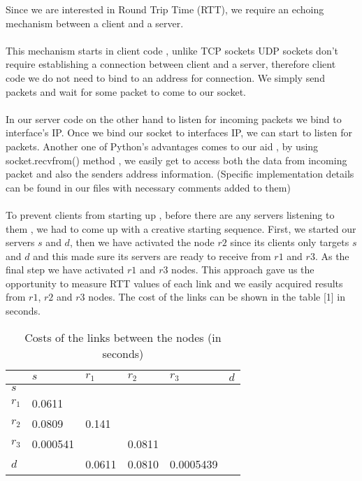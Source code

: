 \documentclass[conference]{IEEEtran}
\begin{document}
Since we are interested in Round Trip Time (RTT), we require an echoing mechanism between a client and a server. \\
\\
This mechanism starts in client code , unlike TCP sockets UDP sockets don't require establishing a connection between client and a server, therefore client code we do not need to bind to an address for connection. We simply send packets and wait for some packet to come to our socket. \\
\\
In our server code on the other hand to listen for incoming packets we bind to interface's IP. Once we bind our socket to interfaces IP,  we can start to listen for packets. Another one of Python's advantages comes to our aid , by using socket.recvfrom() method , we easily get to access both the data from incoming packet and also the senders address information. (Specific implementation details can be found in our files with necessary comments added to them)\\
\\
To prevent clients from starting up , before there are any servers listening to them , we had to come up with a creative starting sequence. First, we started our servers $s$ and $d$, then we have activated the node $r2$ since its clients only targets $s$ and $d$ and this made sure its servers are ready to receive from $r1$ and $r3$. As the final step we have activated $r1$ and $r3$ nodes. This approach gave us the opportunity to measure RTT values of each link and we easily acquired results from $r1$, $r2$ and $r3$ nodes. The cost of the links can be shown in the table [1] in seconds.

\begin{table}[!htbp]
\caption{Costs of the links between the nodes (in seconds)}
\begin{tabular}{|l|l|l|l|l|l|}
\hline
               & \textbf{$s$} & \textbf{$r_1$} & \textbf{$r_2$} & \textbf{$r_3$} & \textbf{$d$} \\ \hline
\textbf{$s$}   &              &                &                &                &              \\ \hline
\textbf{$r_1$} & 0.0611       &                &                &                &              \\ \hline
\textbf{$r_2$} & 0.0809       & 0.141          &                &                &              \\ \hline
\textbf{$r_3$} & 0.000541     &                & 0.0811         &                &              \\ \hline
\textbf{$d$}   &              & 0.0611         & 0.0810         & 0.0005439      &              \\ \hline
\end{tabular}
\end{table}
\end{document}
